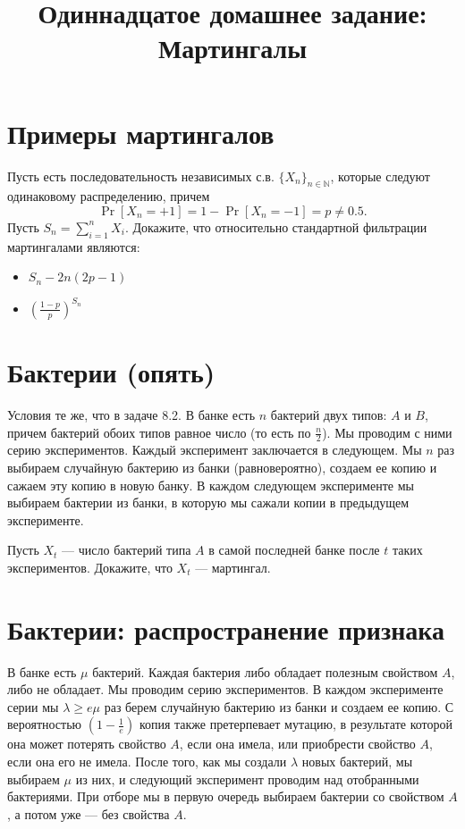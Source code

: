 \documentclass[12pt]{article}
\title{Одиннадцатое домашнее задание: Мартингалы}
\newcommand\N{\mathbb{N}}
\begin{document}
\maketitle

\section{Примеры мартингалов}

Пусть есть последовательность независимых с.в. $\{X_n\}_{n \in \N}$, которые следуют одинаковому распределению, причем \[\Pr[X_n = +1] = 1 - \Pr[X_n = -1] = p \ne 0.5. \]
Пусть $S_n = \sum_{i = 1}^n X_i$. Докажите, что относительно стандартной фильтрации мартингалами являются:
\begin{itemize}
    \item $S_n - 2n(2p - 1)$
    \item $(\frac{1 - p}{p})^{S_n}$
\end{itemize}

\section{Бактерии (опять)}

Условия те же, что в задаче 8.2. В банке есть $n$ бактерий двух типов: $A$ и $B$, причем бактерий обоих типов равное число (то есть по $\frac{n}{2}$). Мы проводим с ними серию экспериментов. Каждый эксперимент заключается в следующем. Мы $n$ раз выбираем случайную бактерию из банки (равновероятно), создаем ее копию и сажаем эту копию в новую банку. В каждом следующем эксперименте мы выбираем бактерии из банки, в которую мы сажали копии в предыдущем эксперименте.

Пусть $X_t$ --- число бактерий типа $A$ в самой последней банке после $t$ таких экспериментов. Докажите, что $X_t$ --- мартингал. 

\section{Бактерии: распространение признака}

В банке есть $\mu$ бактерий. Каждая бактерия либо обладает полезным свойством $A$, либо не обладает. Мы проводим серию экспериментов. В каждом эксперименте серии мы $\lambda \ge e\mu$ раз берем случайную бактерию из банки и создаем ее копию. С вероятностью $(1 - \frac{1}{e})$ копия также претерпевает мутацию, в результате которой она может потерять свойство $A$, если она имела, или приобрести свойство $A$, если она его не имела. После того, как мы создали $\lambda$ новых бактерий, мы выбираем $\mu$ из них, и следующий эксперимент проводим над отобранными бактериями. При отборе мы в первую очередь выбираем бактерии со свойством $A$, а потом уже --- без свойства $A$.
\end{document}
